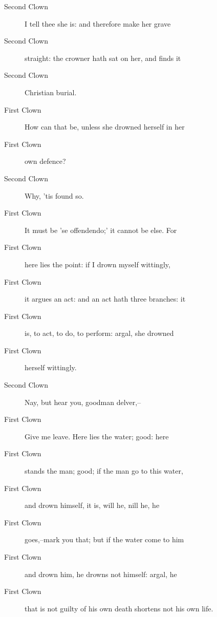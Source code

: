 \documentclass{article}
\begin{document}
\begin{description}
            
\item[Second Clown] I tell thee she is: and therefore make her grave
\item[Second Clown] straight: the crowner hath sat on her, and finds it
\item[Second Clown] Christian burial.
\end{description}
          
\begin{description}
            
\item[First Clown] How can that be, unless she drowned herself in her
\item[First Clown] own defence?
\end{description}
          
\begin{description}
            
\item[Second Clown] Why, 'tis found so.
\end{description}
          
\begin{description}
            
\item[First Clown] It must be 'se offendendo;' it cannot be else. For
\item[First Clown] here lies the point:  if I drown myself wittingly,
\item[First Clown] it argues an act: and an act hath three branches: it
\item[First Clown] is, to act, to do, to perform: argal, she drowned
\item[First Clown] herself wittingly.
\end{description}
          
\begin{description}
            
\item[Second Clown] Nay, but hear you, goodman delver,--
\end{description}
          
\begin{description}
            
\item[First Clown] Give me leave. Here lies the water; good: here
\item[First Clown] stands the man; good; if the man go to this water,
\item[First Clown] and drown himself, it is, will he, nill he, he
\item[First Clown] goes,--mark you that; but if the water come to him
\item[First Clown] and drown him, he drowns not himself: argal, he
\item[First Clown] that is not guilty of his own death shortens not his own life.
\end{description}
          
\end{document}
